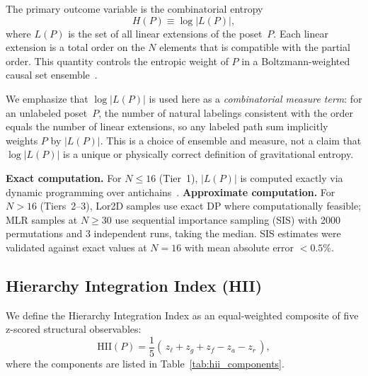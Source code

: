 \documentclass[entropy,article,submit,pdftex,moreauthors]{Definitions/mdpi}
\begin{document}
The primary outcome variable is the combinatorial entropy
\begin{equation}
    H(P) \equiv \log\bigl|L(P)\bigr|,
    \label{eq:entropy}
\end{equation}
where $L(P)$ is the set of all linear extensions of the poset~$P$. Each linear extension is a total order on the $N$ elements that is compatible with the partial order. This quantity controls the entropic weight of $P$ in a Boltzmann-weighted causal set ensemble~\cite{surya2012}.

We emphasize that $\log|L(P)|$ is used here as a \emph{combinatorial measure term}: for an unlabeled poset~$P$, the number of natural labelings consistent with the order equals the number of linear extensions, so any labeled path sum implicitly weights $P$ by $|L(P)|$. This is a choice of ensemble and measure, not a claim that $\log|L(P)|$ is a unique or physically correct definition of gravitational entropy.

\textbf{Exact computation.} For $N \le 16$ (Tier~1), $|L(P)|$ is computed exactly via dynamic programming over antichains~\cite{brightwell1991}. \textbf{Approximate computation.} For $N > 16$ (Tiers~2--3), Lor2D samples use exact DP where computationally feasible; MLR samples at $N \ge 30$ use sequential importance sampling (SIS) with 2000 permutations and 3 independent runs, taking the median. SIS estimates were validated against exact values at $N = 16$ with mean absolute error $< 0.5\%$.

\subsection{Hierarchy Integration Index (HII)}

We define the Hierarchy Integration Index as an equal-weighted composite of five z-scored structural observables:
\begin{equation}
    \text{HII}(P) = \frac{1}{5}\!\left(\,z_\ell + z_g + z_f - z_a - z_r\,\right),
    \label{eq:hii}
\end{equation}
where the components are listed in Table~\ref{tab:hii_components}.
\end{document}

